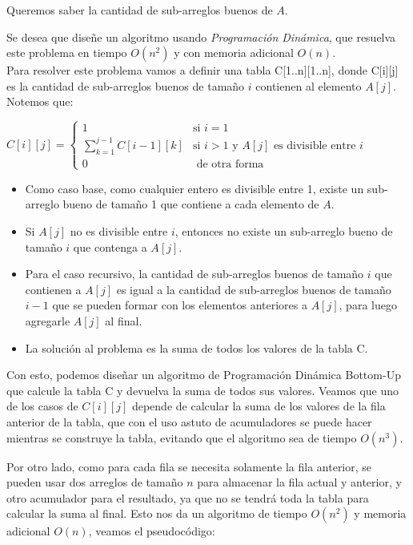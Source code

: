 \documentclass[letterpaper, 12pt]{article}
\begin{document}
\begin{enumerate}
Queremos saber la cantidad de sub-arreglos buenos de $A$.

Se desea que diseñe un algoritmo usando \emph{Programación Dinámica}, que resuelva este problema en tiempo $O(n^2)$ y con memoria adicional $O(n)$. \\

Para resolver este problema vamos a definir una tabla C[1..n][1..n], donde C[i][j] es la cantidad de sub-arreglos buenos de tamaño $i$ contienen al elemento $A[j]$. Notemos que:

\begin{center}
    $C[i][j] = \begin{cases}
        1 & \text{si } i = 1 \\
        \sum_{k = 1}^{j - 1} C[i - 1][k] & \text{si } i > 1 \text{ y } A[j] \text{ es divisible entre } i \\
        0 & \text{ de otra forma }
    \end{cases}$
\end{center}

\begin{itemize}
    \item Como caso base, como cualquier entero es divisible entre 1, existe un sub-arreglo bueno de tamaño 1 que contiene a cada elemento de $A$.
    \item Si $A[j]$ no es divisible entre $i$, entonces no existe un sub-arreglo bueno de tamaño $i$ que contenga a $A[j]$.
    \item Para el caso recursivo, la cantidad de sub-arreglos buenos de tamaño $i$ que contienen a $A[j]$ es igual a la cantidad de sub-arreglos buenos de tamaño $i - 1$ que se pueden formar con los elementos anteriores a $A[j]$, para luego agregarle $A[j]$ al final.
    \item La solución al problema es la suma de todos los valores de la tabla C.
\end{itemize}

Con esto, podemos diseñar un algoritmo de Programación Dinámica Bottom-Up que calcule la tabla C y devuelva la suma de todos sus valores. Veamos que uno de los casos de $C[i][j]$ depende de calcular la suma de los valores de la fila anterior de la tabla, que con el uso astuto de acumuladores se puede hacer mientras se construye la tabla, evitando que el algoritmo sea de tiempo $O(n^3)$.

Por otro lado, como para cada fila se necesita solamente la fila anterior, se pueden usar dos arreglos de tamaño $n$ para almacenar la fila actual y anterior, y otro acumulador para el resultado, ya que no se tendrá toda la tabla para calcular la suma al final. Esto nos da un algoritmo de tiempo $O(n^2)$ y memoria adicional $O(n)$, veamos el pseudocódigo:


\end{enumerate}
\end{document}
